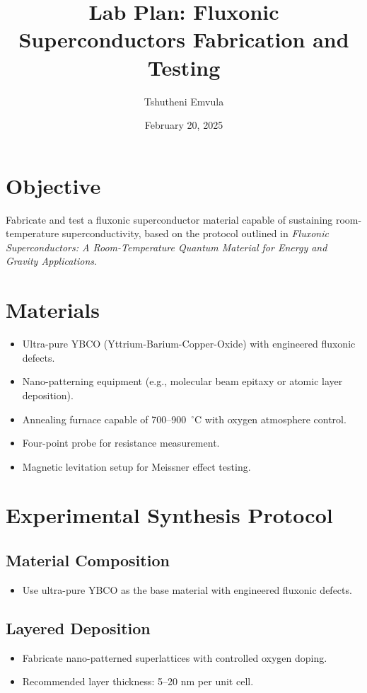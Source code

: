 \documentclass[a4paper,12pt]{article}
\title{Lab Plan: Fluxonic Superconductors Fabrication and Testing}
\author{Tshutheni Emvula}
\date{February 20, 2025}
\begin{document}
\maketitle

\section{Objective}
Fabricate and test a fluxonic superconductor material capable of sustaining room-temperature superconductivity, based on the protocol outlined in \emph{Fluxonic Superconductors: A Room-Temperature Quantum Material for Energy and Gravity Applications}.

\section{Materials}
\begin{itemize}
    \item Ultra-pure YBCO (Yttrium-Barium-Copper-Oxide) with engineered fluxonic defects.
    \item Nano-patterning equipment (e.g., molecular beam epitaxy or atomic layer deposition).
    \item Annealing furnace capable of 700--900~$^\circ$C with oxygen atmosphere control.
    \item Four-point probe for resistance measurement.
    \item Magnetic levitation setup for Meissner effect testing.
\end{itemize}

\section{Experimental Synthesis Protocol}
\subsection{Material Composition}
\begin{itemize}
    \item Use ultra-pure YBCO as the base material with engineered fluxonic defects.
\end{itemize}

\subsection{Layered Deposition}
\begin{itemize}
    \item Fabricate nano-patterned superlattices with controlled oxygen doping.
    \item Recommended layer thickness: 5--20 nm per unit cell.
\end{itemize}
\end{document}
